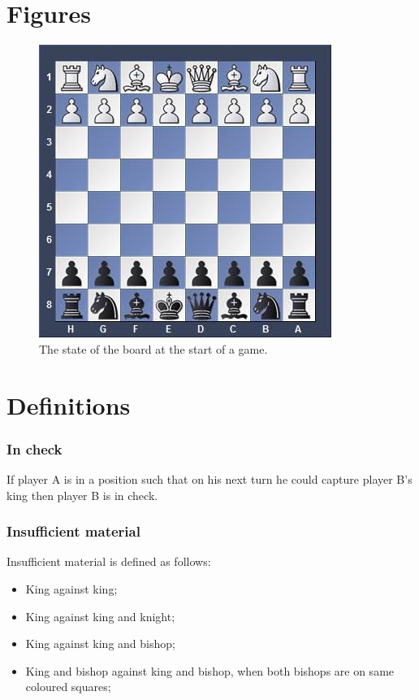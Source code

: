\documentclass{report}
\begin{document}
\begin{center}
\begin{tabular}{ | l | p{5.8cm} | p{4cm} |}
    \end{tabular}
\end{center}


\begin{appendices}
\chapter{Figures}
\listoffigures

\begin{figure}[p]
    \centering   
    \includegraphics[scale=1]{Board_start.jpg}
	\caption[Game start]{The state of the board at the start of a game.}
    \label{fig:Board_start}
\end{figure}

\chapter{Definitions}

\subsection*{In check}
\label{def:In_check}
If player A is in a position such that on his next turn he could capture player B's king then player B is in check.

\subsection*{Insufficient material}
\label{def:Insufficient_material}
Insufficient material is defined as follows:
\begin{itemize}
    \item King against king;
    \item King against king and knight;
    \item King against king and bishop;
    \item King and bishop against king and bishop, when both bishops are on same
    coloured squares;
\end{itemize}


\end{appendices}
\end{document}

